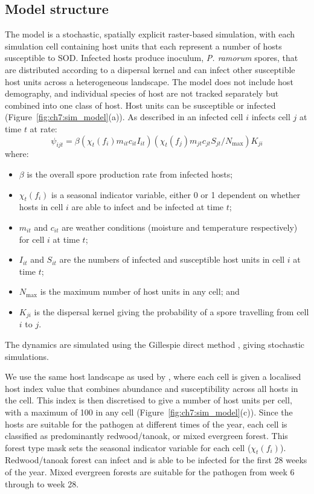 \subsection{Model structure}

The model is a stochastic, spatially explicit raster-based simulation, with each simulation cell containing host units that each represent a number of hosts susceptible to SOD. Infected hosts produce inoculum, \emph{P. ramorum} spores, that are distributed according to a dispersal kernel and can infect other susceptible host units across a heterogeneous landscape. The model does not include host demography, and individual species of host are not tracked separately but combined into one class of host. Host units can be susceptible or infected (Figure~\ref{fig:ch7:sim_model}(a)). As described in \citet{meentemeyer_epidemiological_2011} an infected cell $i$ infects cell $j$ at time $t$ at rate:
\begin{equation}
    \label{eqn:ch7:inf_rate}
    \psi_{ijt} = \beta\left(\chi_t(f_i)m_{it}c_{it}I_{it}\right)\left(\chi_t(f_j)m_{jt}c_{jt}S_{jt}/N_{\text{max}}\right)K_{ji}
\end{equation}
where:
\begin{itemize}
    \item $\beta$ is the overall spore production rate from infected hosts;
    \item $\chi_t(f_i)$ is a seasonal indicator variable, either 0 or 1 dependent on whether hosts in cell $i$ are able to infect and be infected at time $t$;
    \item $m_{it}$ and $c_{it}$ are weather conditions (moisture and temperature respectively) for cell $i$ at time $t$;
    \item $I_{it}$ and $S_{it}$ are the numbers of infected and susceptible host units in cell $i$ at time $t$;
    \item $N_{\text{max}}$ is the maximum number of host units in any cell; and
    \item $K_{ji}$ is the dispersal kernel giving the probability of a spore travelling from cell $i$ to $j$.
\end{itemize}
The dynamics are simulated using the Gillespie direct method \citep{gillespie_exact_1977}, giving stochastic simulations.

We use the same host landscape as used by \citet{meentemeyer_epidemiological_2011}, where each cell is given a localised host index value that combines abundance and susceptibility across all hosts in the cell. This index is then discretised to give a number of host units per cell, with a maximum of 100 in any cell (Figure~\ref{fig:ch7:sim_model}(c)). Since the hosts are suitable for the pathogen at different times of the year, each cell is classified as predominantly redwood/tanoak, or mixed evergreen forest. This forest type mask sets the seasonal indicator variable for each cell ($\chi_t(f_i)$). Redwood/tanoak forest can infect and is able to be infected for the first 28 weeks of the year. Mixed evergreen forests are suitable for the pathogen from week 6 through to week 28.


